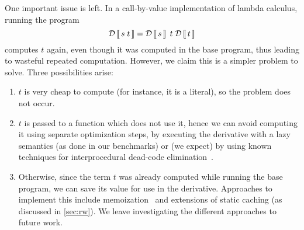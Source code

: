 \begin{oldSec} %
One important issue is left. In a call-by-value
implementation of lambda calculus, running the program
\[
\Derive{\App{s}{t}} = \App{\App{\Derive{s}}{t}}{\Derive{t}}
\]
computes $t$
again, even though it was computed in the base program, thus
leading to wasteful repeated computation.
However, we claim this is a simpler problem to solve.
Three possibilities arise:
\begin{enumerate}
\item $t$ is very cheap to compute (for instance, it is a
  literal), so the problem does not occur.
\item $t$ is passed to a function which does not use it, hence
  we can avoid computing it using separate optimization steps, by
  executing the derivative with a lazy semantics (as done in our
  benchmarks) or (we expect) by using known techniques for
  interprocedural dead-code elimination~\citep{Appel97}.
\item Otherwise, since the term $t$
  was already computed while running the base
  program, we can save its value for use in the derivative.
  Approaches to
  implement this include memoization~ and extensions of
  static caching (as discussed in \cref{sec:rw}).
  We leave investigating the different
  approaches to future work.
\end{enumerate}
\end{oldSec}

